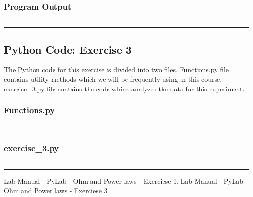\documentclass[letterpaper,12pt]{article}
\begin{document}
\pagebreak
\subsubsection{Program Output}
\noindent\rule{\textwidth}{1pt}

\noindent\rule{\textwidth}{1pt}

\pagebreak

\subsection{Python Code: Exercise 3}

The Python code for this exercise is divided into two files. Functions.py file contains utility methods
which we will be frequently using in this course. exercise\_3.py file contains the code which analyzes
the data for this experiment.

\subsubsection{Functions.py}

\noindent\rule{\textwidth}{1pt}

\noindent\rule{\textwidth}{1pt}

\pagebreak

\subsubsection{exercise\_3.py}
\noindent\rule{\textwidth}{1pt}

\noindent\rule{\textwidth}{1pt}
\pagebreak

\begin{thebibliography}{99}

 Lab Manual - PyLab - Ohm and Power laws - Exerciese 1.
 Lab Manual - PyLab - Ohm and Power laws - Exerciese 3.

\end{thebibliography}
\end{document}
